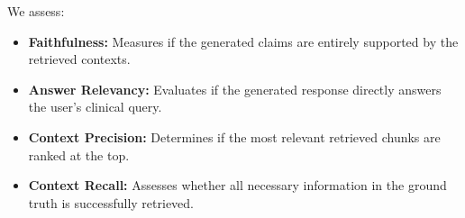 We assess:
\begin{itemize}
    \item \textbf{Faithfulness:} Measures if the generated claims are entirely supported by the retrieved contexts.
    \item \textbf{Answer Relevancy:} Evaluates if the generated response directly answers the user's clinical query.
    \item \textbf{Context Precision:} Determines if the most relevant retrieved chunks are ranked at the top.
    \item \textbf{Context Recall:} Assesses whether all necessary information in the ground truth is successfully retrieved.
\end{itemize}
